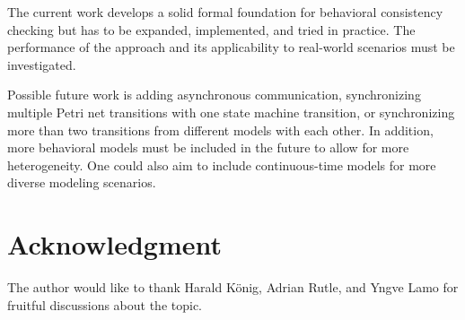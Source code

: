 \documentclass[conference]{IEEEtran}
\begin{document}
The current work develops a solid formal foundation for behavioral consistency checking but has to be expanded, implemented, and tried in practice.
The performance of the approach and its applicability to real-world scenarios must be investigated.

Possible future work is adding asynchronous communication, synchronizing multiple Petri net transitions with one state machine transition, or synchronizing more than two transitions from different models with each other.
In addition, more behavioral models must be included in the future to allow for more heterogeneity.
One could also aim to include continuous-time models for more diverse modeling scenarios.

\section*{Acknowledgment}
The author would like to thank Harald König, Adrian Rutle, and Yngve Lamo for fruitful discussions about the topic.



\end{document}
